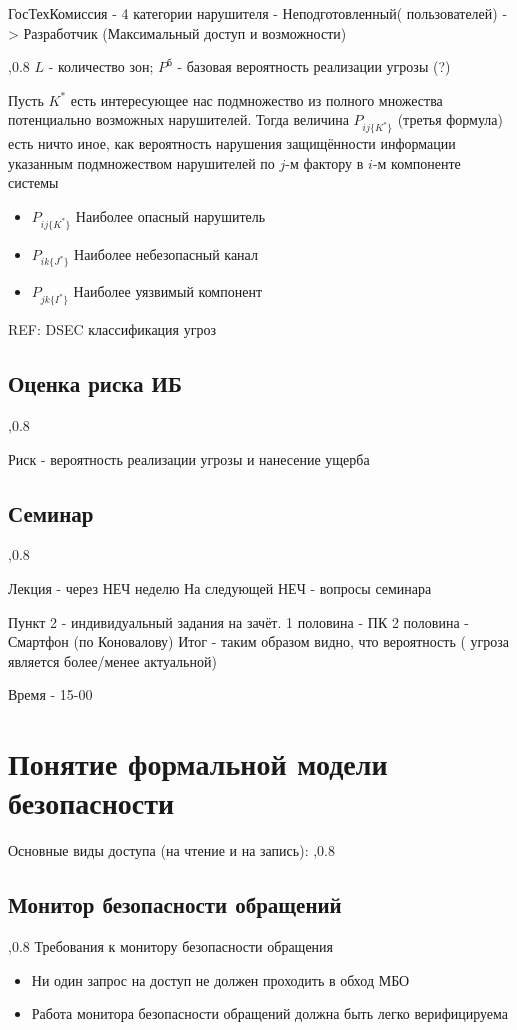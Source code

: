 \documentclass[a4paper,12pt]{report}
\begin{document}
		ГосТехКомиссия - 4 категории нарушителя - Неподготовленный( пользователей) -> Разработчик (Максимальный доступ и возможности)

		,0.8
		$L$ - количество зон;
		$P^{\mbox{б}}$ - базовая вероятность реализации угрозы (?)

		Пусть $K^*$ есть интересующее нас подмножество из полного множества потенциально возможных нарушителей. Тогда величина $P_{ij\{K^*\}}$ (третья формула) есть ничто иное, как вероятность нарушения защищённости информации указанным подмножеством нарушителей по $j$-м фактору в $i$-м компоненте системы
		\begin{itemize}
			\item $P_{ij\{K^*\}}$		Наиболее опасный нарушитель
			\item $P_{ik\{J^*\}}$		Наиболее небезопасный канал
			\item $P_{jk\{I^*\}}$		Наиболее уязвимый компонент
		\end{itemize}

		REF: DSEC классификация угроз

		\subsection{Оценка риска ИБ}
		,0.8

		Риск - вероятность реализации угрозы и нанесение ущерба

	\subsection{Семинар}
		,0.8

		Лекция - через НЕЧ неделю
		На следующей НЕЧ - вопросы семинара

		Пункт 2 - индивидуальный задания на зачёт.
		1 половина  - ПК
		2 половина - Смартфон
		(по Коновалову)
		Итог  - таким  образом видно, что вероятность ( угроза является более/менее актуальной)

		Время - 15-00


	\section{Понятие формальной модели безопасности}
	Основные виды доступа (на чтение и на запись):
	,0.8

	\subsection{Монитор безопасности обращений}
	,0.8
	Требования к монитору безопасности обращения
	\begin{itemize}
		\item Ни один запрос на доступ не должен проходить в обход МБО
		\item Работа монитора безопасности обращений должна быть легко верифицируема
	\end{itemize}
\end{document}
